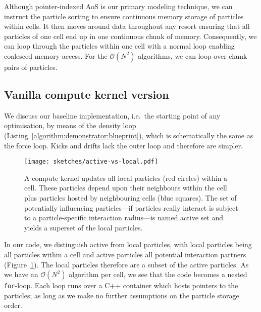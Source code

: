 Although pointer-indexed AoS is our primary modeling technique, we can instruct the particle sorting to ensure continuous memory storage of particles within cells. 
It then moves around data throughout any resort ensuring that all particles of one cell end up in one continuous chunk of memory.
Consequently, we can loop through the particles within one cell with a normal loop enabling coalesced memory access.
For the $\mathcal{O}(N^2)$ algorithms, we can loop over chunk pairs of particles.




\subsection{Vanilla compute kernel version}



We discuss our baseline implementation, i.e.~the starting point of any optimisation, by means of the density loop (Listing~\ref{algorithm:demonstrator:blueprint}), which is schematically the same as the force loop. 
Kicks and drifts lack the outer loop and therefore are simpler.


\begin{figure}
 \begin{center}
  \texttt{[image: sketches/active-vs-local.pdf]}
 \end{center}
 \caption{
  A compute kernel updates all local particles (red circles) within a cell.
  These particles depend upon their neighbours within the cell plus particles hosted by neighbouring cells (blue squares).
  The set of potentially influencing particles---if particles really interact is subject to a particle-specific interaction radius---is named active set and yields a superset of the local particles.
  \label{figure:demonstrators:active-vs-local}
 }
\end{figure}

In our code, we distinguish active from local particles, with local particles being all particles within a cell and active particles all potential interaction partners (Figure~\ref{figure:demonstrators:active-vs-local}). 
The local particles therefore are a subset of the active particles.
As we have an $\mathcal{O}(N^2)$ algorithm per cell, we see that the code becomes a nested \texttt{for}-loop.
Each loop runs over a C++ container which hosts pointers to the particles; as long as we make no further assumptions on the particle storage order.


